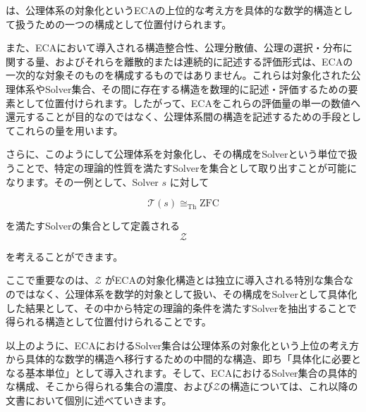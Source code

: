 \documentclass[12pt,a4paper]{article}
\begin{document}
は、公理体系の対象化というECAの上位的な考え方を具体的な数学的構造として扱うための一つの構成として位置付けられます。

また、ECAにおいて導入される構造整合性、公理分散値、公理の選択・分布に関する量、およびそれらを離散的または連続的に記述する評価形式は、ECAの一次的な対象そのものを構成するものではありません。これらは対象化された公理体系やSolver集合、その間に存在する構造を数理的に記述・評価するための要素として位置付けられます。したがって、ECAをこれらの評価量の単一の数値へ還元することが目的なのではなく、公理体系間の構造を記述するための手段としてこれらの量を用います。

さらに、このようにして公理体系を対象化し、その構成をSolverという単位で扱うことで、特定の理論的性質を満たすSolverを集合として取り出すことが可能になります。その一例として、Solver $s$ に対して

\[
\mathcal{T}(s) \cong_{\mathrm{Th}} \mathrm{ZFC}
\]

を満たすSolverの集合として定義される
\[
\mathcal{Z}
\]

を考えることができます。

ここで重要なのは、$\mathcal{Z}$ がECAの対象化構造とは独立に導入される特別な集合なのではなく、公理体系を数学的対象として扱い、その構成をSolverとして具体化した結果として、その中から特定の理論的条件を満たすSolverを抽出することで得られる構造として位置付けられることです。

以上のように、ECAにおけるSolver集合は公理体系の対象化という上位の考え方から具体的な数学的構造へ移行するための中間的な構造、即ち「具体化に必要となる基本単位」として導入されます。そして、ECAにおけるSolver集合の具体的な構成、そこから得られる集合の濃度、および$\mathcal{Z}$の構造については、これ以降の文書において個別に述べていきます。
\end{document}
